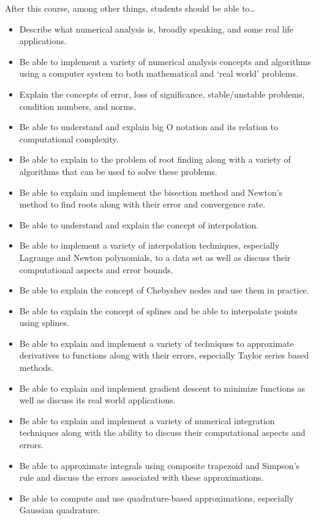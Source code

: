 \documentclass[11pt,letterpaper]{article}
\begin{document}
After this course, among other things, students should be able to\dots
	\begin{itemize} \itemsep=0.3ex
	\item Describe what numerical analysis is, broadly speaking, and some real life applications.
	\item Be able to implement a variety of numerical analysis concepts and algorithms using a computer system to both mathematical and `real world' problems.
	\item Explain the concepts of error, loss of significance, stable/unstable problems, condition numbers, and norms. 
	\item Be able to understand and explain big O notation and its relation to computational complexity.
	\item Be able to explain to the problem of root finding along with a variety of algorithms that can be used to solve these problems. 
	\item Be able to explain and implement the bisection method and Newton's method to find roots along with their error and convergence rate. 
	\item Be able to understand and explain the concept of interpolation. 
	\item Be able to implement a variety of interpolation techniques, especially Lagrange and Newton polynomials, to a data set as well as discuss their computational aspects and error bounds.
	\item Be able to explain the concept of Chebyshev nodes and use them in practice.
	\item Be able to explain the concept of splines and be able to interpolate points using splines.
	\item Be able to explain and implement a variety of techniques to approximate derivatives to functions along with their errors, especially Taylor series based methods. 
	\item Be able to explain and implement gradient descent to minimize functions as well as discuss its real world applications. 
	\item Be able to explain and implement a variety of numerical integration techniques along with the ability to discuss their computational aspects and errors.
	\item Be able to approximate integrals using composite trapezoid and Simpson's rule and discuss the errors associated with these approximations. 
	\item Be able to compute and use quadrature-based approximations, especially Gaussian quadrature. 

\end{itemize}
\end{document}
